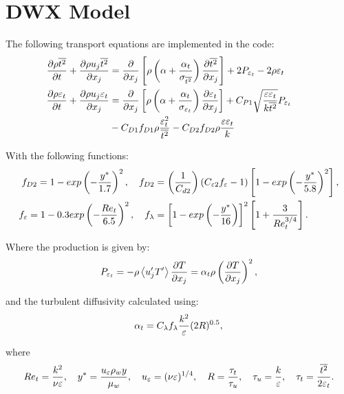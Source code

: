 

\section{DWX Model}
The following transport equations are implemented in the code:
\begin{equation} \label{eq:ktDeng}
\begin{split}
\frac{\partial \rho \overline{t^2}}{\partial t} + \frac{\partial \rho u_j \overline{t^2}}{\partial x_j} &= \frac{\partial}{\partial x_j}\left[\rho \left(\alpha + \frac{\alpha_t}{\sigma_{\overline{t^2}}}\right)\frac{\partial \overline{t^2}}{\partial x_j}\right] + 2 P_{{\varepsilon}_t}- 2 \rho \varepsilon_t \\
\frac{\partial \rho \varepsilon_t}{\partial t} + \frac{\partial \rho u_j \varepsilon_t}{\partial x_j} &= \frac{\partial}{\partial x_j}\left[\rho \left(\alpha + \frac{\alpha_t}{\sigma_{\varepsilon_t}}\right)\frac{\partial \varepsilon_t}{\partial x_j}\right] + C_{P1}\sqrt{\frac{{\varepsilon}{\varepsilon}_t}{k\overline{t^2}}} P_{{\varepsilon}_t} \qquad \\ &- C_{D1} f_{D1}\rho\frac{{\varepsilon}_t^2}{\overline{t^2}}  - C_{D2} f_{D2}\rho\frac{{\varepsilon}{\varepsilon}_t}{k}   
\end{split}
\end{equation}

With the following functions:
\begin{equation}
\begin{split}
f_{D2} = 1-exp\left(-\frac{y^*}{1.7}\right)^2,\quad f_{D2} &= \left(\frac{1}{C_{d2}}\right)(C_{{\varepsilon}2}f_{\varepsilon}-1)\left[1-exp\left(-\frac{y^*}{5.8}\right)^2\right], \\
f_{\varepsilon} = 1-0.3exp\left(-\frac{Re_t}{6.5}\right)^2, \quad f_\lambda &= \left[1-exp\left(-\frac{y^*}{16}\right)\right]^2\left[1+\frac{3}{Re_t^{3/4}}\right].
\end{split}
\end{equation}

Where the production is given by:
\begin{equation}
P_{{\varepsilon}_t}=-\rho \left<{u'_j T'}\right> \frac{\partial T}{ \partial x_j}= \alpha_t \rho \left(\frac{ \partial T}{\partial x_j}\right)^2,
\end{equation} 

and the turbulent diffusivity calculated using:
\begin{equation}
\alpha_t = C_\lambda f_\lambda \frac{k^2}{{\varepsilon}}(2R)^{0.5},
\end{equation} 

where
\begin{equation}
Re_t = \frac{k^2}{\nu\varepsilon}, \quad y^*= \frac{u_\varepsilon \rho_w y}{\mu_w}, \quad u_\varepsilon = (\nu\varepsilon)^{1/4}, \quad R = \frac{\tau_t}{\tau_u}, \quad \tau_u = \frac{k}{{\varepsilon}}, \quad \tau_t = \frac{\overline{t^2}}{2{\varepsilon}_t}.
\end{equation}

